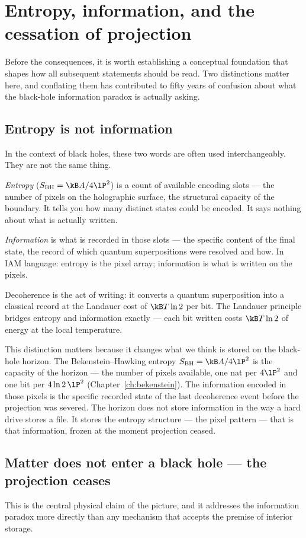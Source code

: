 \section{Entropy, information, and the cessation of projection}\label{sec:bi_entropy}
Before the consequences, it is worth establishing a conceptual foundation that shapes how all subsequent statements should be read. Two distinctions matter
here, and conflating them has contributed to fifty years of confusion about what the black-hole information paradox is actually asking.

\subsection{Entropy is not information}
In the context of black holes, these two words are often used interchangeably. They are not the same thing.

\emph{Entropy} ($S_{\rm BH}=\kB A/4\lP^2$) is a count of available encoding slots --- the number of pixels on the holographic surface, the structural capacity of the
boundary. It tells you how many distinct states could be encoded. It says nothing about what is actually written.

\emph{Information} is what is recorded in those slots --- the specific content of the final state, the record of which quantum superpositions were resolved and
how. In IAM language: entropy is the pixel array; information is what is written on the pixels.

Decoherence is the act of writing: it converts a quantum superposition into a classical record at the Landauer cost of $\kB T\ln2$ per bit. The Landauer
principle bridges entropy and information exactly --- each bit written costs $\kB T\ln2$ of energy at the local temperature.

This distinction matters because it changes what we think is stored on the black-hole horizon. The Bekenstein--Hawking entropy $S_{\rm BH}=\kB A/4\lP^2$ is the
capacity of the horizon --- the number of pixels available, one nat per $4\lP^2$ and one bit per $4\ln2\,\lP^2$ (Chapter~\ref{ch:bekenstein}). The information encoded in
those pixels is the specific recorded state of the last decoherence event before the projection was severed. The horizon does not store information in the
way a hard drive stores a file. It stores the entropy structure --- the pixel pattern --- that is that information, frozen at the moment projection ceased.
\interp

\subsection{Matter does not enter a black hole --- the projection ceases}
This is the central physical claim of the picture, and it addresses the information paradox more directly than any mechanism that accepts the premise of
interior storage.

